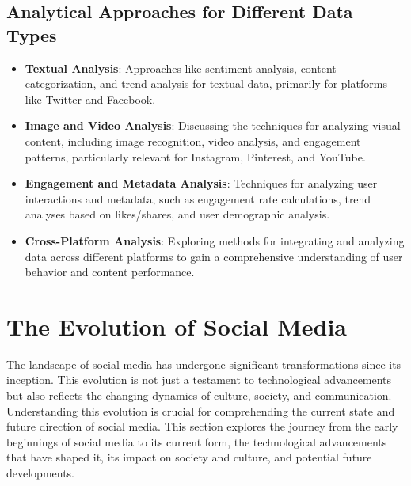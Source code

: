 \documentclass[
]{book}
\providecommand{\tightlist}{%
  \setlength{\itemsep}{0pt}\setlength{\parskip}{0pt}}
\begin{document}
\hypertarget{analytical-approaches-for-different-data-types}{%
\subsection*{Analytical Approaches for Different Data Types}\label{analytical-approaches-for-different-data-types}}

\begin{itemize}
\tightlist
\item
  \textbf{Textual Analysis}: Approaches like sentiment analysis, content categorization, and trend analysis for textual data, primarily for platforms like Twitter and Facebook.
\item
  \textbf{Image and Video Analysis}: Discussing the techniques for analyzing visual content, including image recognition, video analysis, and engagement patterns, particularly relevant for Instagram, Pinterest, and YouTube.
\item
  \textbf{Engagement and Metadata Analysis}: Techniques for analyzing user interactions and metadata, such as engagement rate calculations, trend analyses based on likes/shares, and user demographic analysis.
\item
  \textbf{Cross-Platform Analysis}: Exploring methods for integrating and analyzing data across different platforms to gain a comprehensive understanding of user behavior and content performance.
\end{itemize}

\hypertarget{the-evolution-of-social-media}{%
\section*{The Evolution of Social Media}\label{the-evolution-of-social-media}}

The landscape of social media has undergone significant transformations since its inception. This evolution is not just a testament to technological advancements but also reflects the changing dynamics of culture, society, and communication. Understanding this evolution is crucial for comprehending the current state and future direction of social media. This section explores the journey from the early beginnings of social media to its current form, the technological advancements that have shaped it, its impact on society and culture, and potential future developments.
\end{document}
